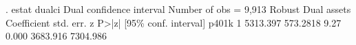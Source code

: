 . estat dualci
{\smallskip}
Dual confidence interval                                 Number of obs = 9,913
             {\VBAR}               Robust                               Dual
      assets {\VBAR} Coefficient  std. err.      z    P>|z|     [95\% conf. interval]
       p401k {\VBAR}
          1  {\VBAR}   5313.397   573.2818     9.27   0.000     3683.916    7304.986

